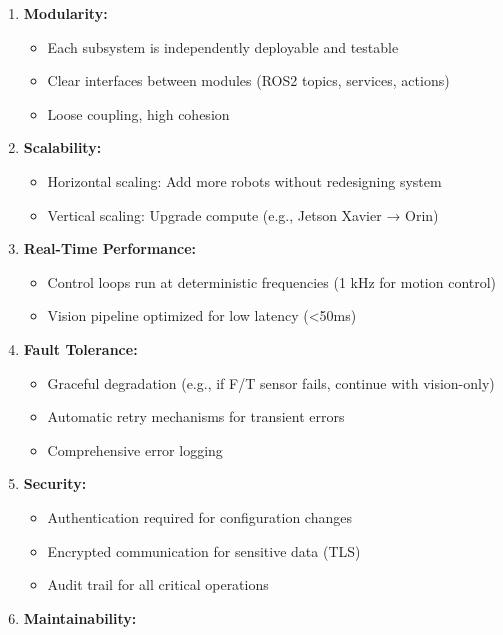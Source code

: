 \documentclass[
]{article}
\providecommand{\tightlist}{%
  \setlength{\itemsep}{0pt}\setlength{\parskip}{0pt}}
\begin{document}
\begin{enumerate}
\def\labelenumi{\arabic{enumi}.}
\tightlist
\item
  \textbf{Modularity:}

  \begin{itemize}
  \tightlist
  \item
    Each subsystem is independently deployable and testable
  \item
    Clear interfaces between modules (ROS2 topics, services, actions)
  \item
    Loose coupling, high cohesion
  \end{itemize}
\item
  \textbf{Scalability:}

  \begin{itemize}
  \tightlist
  \item
    Horizontal scaling: Add more robots without redesigning system
  \item
    Vertical scaling: Upgrade compute (e.g., Jetson Xavier → Orin)
  \end{itemize}
\item
  \textbf{Real-Time Performance:}

  \begin{itemize}
  \tightlist
  \item
    Control loops run at deterministic frequencies (1 kHz for motion
    control)
  \item
    Vision pipeline optimized for low latency (\textless50ms)
  \end{itemize}
\item
  \textbf{Fault Tolerance:}

  \begin{itemize}
  \tightlist
  \item
    Graceful degradation (e.g., if F/T sensor fails, continue with
    vision-only)
  \item
    Automatic retry mechanisms for transient errors
  \item
    Comprehensive error logging
  \end{itemize}
\item
  \textbf{Security:}

  \begin{itemize}
  \tightlist
  \item
    Authentication required for configuration changes
  \item
    Encrypted communication for sensitive data (TLS)
  \item
    Audit trail for all critical operations
  \end{itemize}
\item
  \textbf{Maintainability:}


\end{enumerate}
\end{document}
